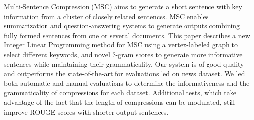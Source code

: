 Multi-Sentence Compression (MSC) aims to generate a short sentence with key information from a cluster of closely related sentences. MSC enables summarization and question-answering systems to generate outputs combining fully formed sentences from one or several documents. This paper describes a new Integer Linear Programming method for MSC using a vertex-labeled graph to select different keywords, and novel 3-gram scores to generate more informative sentences while maintaining their grammaticality. Our system is of good quality and outperforms the state-of-the-art for evaluations led on news dataset. We led both automatic and manual evaluations to determine the informativeness and the grammaticality of compressions for each dataset. Additional tests, which take advantage of the fact that the length of compressions can be modulated, still improve ROUGE scores with shorter output sentences.
